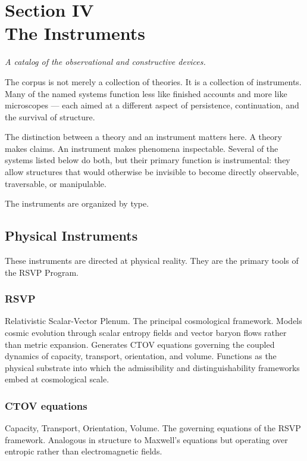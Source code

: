 \documentclass[12pt, openany]{book}
\begin{document}
\cleardoublepage

\chapter[The Instruments]{Section IV \\ The Instruments}

\noindent\textit{A catalog of the observational and constructive devices.}

\bigskip

\noindent The corpus is not merely a collection of theories. It is a
collection of instruments. Many of the named systems function less like
finished accounts and more like microscopes — each aimed at a different
aspect of persistence, continuation, and the survival of structure.

The distinction between a theory and an instrument matters here. A theory
makes claims. An instrument makes phenomena inspectable. Several of the
systems listed below do both, but their primary function is instrumental:
they allow structures that would otherwise be invisible to become directly
observable, traversable, or manipulable.

The instruments are organized by type.

\section{Physical Instruments}

These instruments are directed at physical reality. They are the primary
tools of the RSVP Program.

\subsection{RSVP} Relativistic Scalar-Vector Plenum. The principal
cosmological framework. Models cosmic evolution through scalar entropy fields
and vector baryon flows rather than metric expansion. Generates CTOV
equations governing the coupled dynamics of capacity, transport, orientation,
and volume. Functions as the physical substrate into which the admissibility
and distinguishability frameworks embed at cosmological scale.

\subsection{CTOV equations} Capacity, Transport, Orientation, Volume. The
governing equations of the RSVP framework. Analogous in structure to
Maxwell's equations but operating over entropic rather than electromagnetic
fields.
\end{document}
